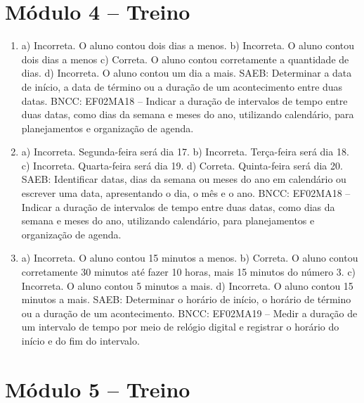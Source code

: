 \section*{Módulo 4 – Treino}

\begin{enumerate}
\item
a) Incorreta. O aluno contou dois dias a menos.
b) Incorreta. O aluno contou dois dias a menos
c) Correta. O aluno contou corretamente a quantidade de dias.
d) Incorreta. O aluno contou um dia a mais.
SAEB: Determinar a data de início, a data de término ou a
duração de um acontecimento entre duas datas.
BNCC: EF02MA18 -- Indicar a duração de intervalos de tempo entre duas
datas, como dias da semana e meses do ano, utilizando calendário, para planejamentos e organização
de agenda.

\item
a) Incorreta. Segunda-feira será dia 17.
b) Incorreta. Terça-feira será dia 18.
c) Incorreta. Quarta-feira será dia 19.
d) Correta. Quinta-feira será dia 20.
SAEB: Identificar datas, dias da semana ou meses do ano em calendário ou escrever uma data, apresentando o dia, o mês e o ano.
BNCC: EF02MA18 -- Indicar a duração de intervalos de tempo entre duas datas, como dias da semana e meses do ano, utilizando calendário, para planejamentos e organização de agenda.

\item
a) Incorreta. O aluno contou 15 minutos a menos.
b) Correta. O aluno contou corretamente 30 minutos até fazer 10 horas, mais 15 minutos do número 3.
c) Incorreta. O aluno contou 5 minutos a mais.
d) Incorreta. O aluno contou 15 minutos a mais.
SAEB: Determinar o horário de início, o horário de término ou a
duração de um acontecimento.
BNCC: EF02MA19 -- Medir a duração de um intervalo de tempo por meio de
relógio digital e registrar o horário do início e do fim do intervalo.
\end{enumerate}

\section*{Módulo 5 – Treino}

